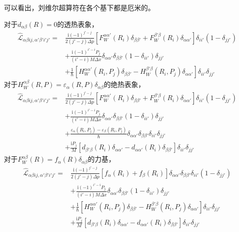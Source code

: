 \documentclass[UTF8,12pt]{article}
\begin{document}
        可以看出，刘维尔超算符在各个基下都是厄米的。\par
        对于$d_{\alpha\beta}(R)=0$的透热表象，
        \begin{align}
            \hat{\mathcal{L}}_{\alpha\beta ij,\alpha'\beta'i'j'}=&\frac{\mathrm{i}(-1)^{j'-j}}{2(j'-j)\Delta p}[F_W^{\alpha\alpha'}(R_i)\delta_{\beta\beta'}+F_W^{\beta'\beta}(R_i)\delta_{\alpha\alpha'}]\delta_{ii'}(1-\delta_{jj'}) \nonumber \\
            &+\frac{\mathrm{i}(-1)^{i'-i}P_j}{(i'-i)M\Delta x}\delta_{\alpha\alpha'}\delta_{\beta\beta'}(1-\delta_{ii'})\delta_{jj'} \nonumber \\
            &+\frac{1}{\hbar}[H_W^{\alpha\alpha'}(R_i,P_j)\delta_{\beta\beta'}-H_W^{\beta'\beta}(R_i,P_j)\delta_{\alpha\alpha'}]\delta_{ii'}\delta_{jj'}
        \end{align}
        对于$H_W^{\alpha\beta}(R,P)=\varepsilon_\alpha(R,P)\delta_{\alpha\beta}$的绝热表象，
        \begin{align}
            \hat{\mathcal{L}}_{\alpha\beta ij,\alpha'\beta'i'j'}=&\frac{\mathrm{i}(-1)^{j'-j}}{2(j'-j)\Delta p}[F_W^{\alpha\alpha'}(R_i)\delta_{\beta\beta'}+F_W^{\beta'\beta}(R_i)\delta_{\alpha\alpha'}]\delta_{ii'}(1-\delta_{jj'}) \nonumber \\
            &+\frac{\mathrm{i}(-1)^{i'-i}P_j}{(i'-i)M\Delta x}\delta_{\alpha\alpha'}\delta_{\beta\beta'}(1-\delta_{ii'})\delta_{jj'} \nonumber \\
            &+\frac{\varepsilon_\alpha(R_i,P_j)-\varepsilon_\beta(R_i,P_j)}{\hbar}\delta_{\alpha\alpha'}\delta_{\beta\beta'}\delta_{ii'}\delta_{jj'} \nonumber \\
            &+\frac{\mathrm{i}P_j}{M}[d_{\beta'\beta}(R_i)\delta_{\alpha\alpha'}-d_{\alpha\alpha'}(R_i)\delta_{\beta\beta'}]\delta_{ii'}\delta_{jj'}
        \end{align}
        对于$F_W^{\alpha\beta}(R)=f_\alpha(R)\delta_{\alpha\beta}$的力基，
        \begin{align}
            \hat{\mathcal{L}}_{\alpha\beta ij,\alpha'\beta'i'j'}=&\frac{\mathrm{i}(-1)^{j'-j}}{2(j'-j)\Delta p}[f_{\alpha}(R_i)+f_\beta(R_i)]\delta_{\alpha\alpha'}\delta_{\beta\beta'}\delta_{ii'}(1-\delta_{jj'}) \nonumber \\
            &+\frac{\mathrm{i}(-1)^{i'-i}P_j}{(i'-i)M\Delta x}\delta_{\alpha\alpha'}\delta_{\beta\beta'}(1-\delta_{ii'})\delta_{jj'} \nonumber \\
            &+\frac{1}{\hbar}[H_W^{\alpha\alpha'}(R_i,P_j)\delta_{\beta\beta'}-H_W^{\beta'\beta}(R_i,P_j)\delta_{\alpha\alpha'}]\delta_{ii'}\delta_{jj'} \nonumber \\
            &+\frac{\mathrm{i}P_j}{M}[d_{\beta'\beta}(R_i)\delta_{\alpha\alpha'}-d_{\alpha\alpha'}(R_i)\delta_{\beta\beta'}]\delta_{ii'}\delta_{jj'}
        \end{align}\par
\end{document}
